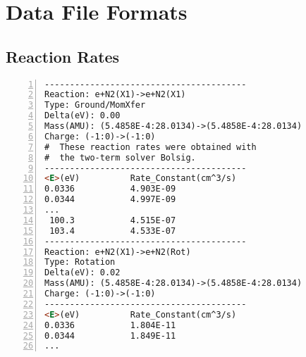 \section{Data File Formats}

\subsection{Reaction Rates}


\begin{lstlisting}[numbers=left,language=HTML,basicstyle=\small]
----------------------------------------
Reaction: e+N2(X1)->e+N2(X1)                            
Type: Ground/MomXfer					
Delta(eV): 0.00
Mass(AMU): (5.4858E-4:28.0134)->(5.4858E-4:28.0134)
Charge: (-1:0)->(-1:0)
#  These reaction rates were obtained with
#  the two-term solver Bolsig.
----------------------------------------
<E>(eV)          Rate_Constant(cm^3/s)
0.0336           4.903E-09
0.0344           4.997E-09
...
 100.3           4.515E-07
 103.4           4.533E-07
----------------------------------------
Reaction: e+N2(X1)->e+N2(Rot)
Type: Rotation
Delta(eV): 0.02
Mass(AMU): (5.4858E-4:28.0134)->(5.4858E-4:28.0134)
Charge: (-1:0)->(-1:0)
----------------------------------------
<E>(eV)          Rate_Constant(cm^3/s)
0.0336           1.804E-11
0.0344           1.849E-11
...
\end{lstlisting}



